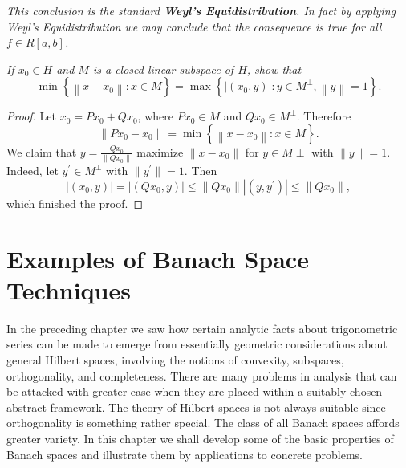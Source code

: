 \begin{note}\em
This conclusion is the standard \textbf{Weyl's Equidistribution}. In fact by applying Weyl's Equidistribution we may conclude that the consequence is true for all $f\in R[a,b]$.
\end{note}
\begin{problem}\em
If $x_0\in H$ and $M$ is a closed linear subspace of $H$, show that 
$$
\min \left\{ \left\| x-x_0 \right\| :x\in M \right\} =\max \left\{ \left| \left( x_0,y \right) \right|:y\in M^{\bot},\left\| y \right\| =1 \right\} .
$$
\end{problem}
\begin{proof}
Let $x_0=Px_0+Qx_0$, where $Px_0\in M$ and $Qx_0\in M^\perp$. Therefore 
$$
\left\| Px_0-x_0 \right\| =\min \left\{ \left\| x-x_0 \right\| :x\in M \right\} .
$$
We claim that $y=\frac{Qx_0}{\|Qx_0\|}$ maximize $\|x-x_0\|$ for $y\in M\perp$ with $\|y\|=1$. Indeed, let $y^\prime\in M^\perp$ with $\|y^\prime\|=1$. Then 
$$
\left| \left( x_0,y \right) \right|=\left| \left( Qx_0,y \right) \right|\le \left\| Qx_0 \right\| \left| \left( y,y^{\prime} \right) \right|\le \left\| Qx_0 \right\| ,
$$
which finished the proof.
\end{proof}
\newpage
\section{Examples of Banach Space Techniques}
In the preceding chapter we saw how certain analytic facts about trigonometric series can be made to emerge from essentially geometric considerations about general Hilbert spaces, involving the notions of convexity, subspaces, orthogonality, and completeness. There are many problems in analysis that can be attacked with greater ease when they are placed within a suitably chosen abstract framework. The theory of Hilbert spaces is not always suitable since orthogonality is something rather special. The class of all Banach spaces affords greater variety. In this chapter we shall develop some of the basic properties of Banach spaces and illustrate them by applications to concrete problems.
